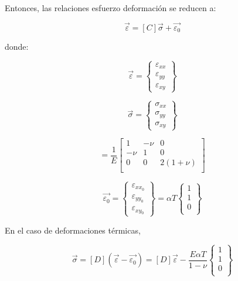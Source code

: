 Entonces, las relaciones esfuerzo deformación se reducen a:

\begin{equation}
\vec{\varepsilon} = [C] \vec{\sigma} + \vec{\varepsilon_0}
\end{equation}

donde:

\begin{equation}
\vec{\varepsilon} = 
\left\{\begin{matrix}
\varepsilon_{xx} \\ \varepsilon_{yy} \\ \varepsilon_{xy}
\end{matrix}\right\}
\end{equation}

\begin{equation}
\vec{\sigma} = 
\left\{\begin{matrix}
\sigma_{xx} \\ \sigma_{yy} \\ \sigma_{xy}
\end{matrix}\right\}
\end{equation}

\begin{equation}
[C] = \frac{1}{E}
\left[\begin{matrix}
1 & -\nu & 0 \\
-\nu & 1 & 0 \\
0 & 0 & 2(1+\nu) \\
\end{matrix}\right]
\end{equation}

\begin{equation}
\vec{\varepsilon_0} = 
\left\{\begin{matrix}
\varepsilon_{xx_0} \\ \varepsilon_{yy_0} \\ \varepsilon_{xy_0}
\end{matrix}\right\} =
\alpha T 
\left\{\begin{matrix}
1 \\ 1 \\ 0 \\
\end{matrix}\right\}
\end{equation}

En el caso de deformaciones térmicas,

\begin{equation}
\vec{\sigma} = [D] (\vec{\varepsilon} - \vec{\varepsilon_0}) = 
[D] \vec{\varepsilon} - 
\frac{E\alpha T}{1-\nu} 
\left\{\begin{matrix}
1 \\ 1 \\ 0 \\
\end{matrix}\right\}
\end{equation}

